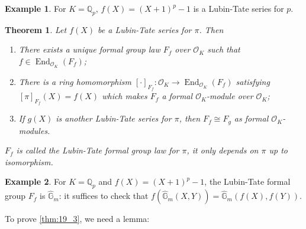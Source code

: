 \documentclass[11pt]{article}
\theoremstyle{definition}
\newtheorem*{example}{Example}
\theoremstyle{plain}
\newtheorem{theorem}[definition]{Theorem}
\theoremstyle{remark}
\DeclareMathOperator{\End}{End}
\newcommand{\QQ}{\mathbb{Q}}
\newcommand{\cO}{\mathcal{O}}
\newcommand{\Ghat}{\widehat{\mathbb{G}}}
\begin{document}
\begin{example}
    For $K = \QQ_p$, $f(X) = (X+1)^p-1$ is a Lubin-Tate series for $p$.
\end{example}

\begin{theorem}\label{thm:19_3}
    Let $f(X)$ be a Lubin-Tate series for $\pi$. Then
    \begin{enumerate}
        \item There exists a unique formal group law $F_f$ over $\cO_K$ such that $f \in \End_{\cO_K}(F_f)$;
        \item There is a ring homomorphism $[\cdot]_{F_f} : \cO_K \to \End_{\cO_K}(F_f)$ satisfying $[\pi]_{F_f}(X) = f(X)$ which makes $F_f$ a formal $\cO_K$-module over $\cO_K$;
        \item If $g(X)$ is another Lubin-Tate series for $\pi$, then $F_f \cong F_g$ as formal $\cO_K$-modules.
    \end{enumerate}
    $F_f$ is called the \emph{Lubin-Tate formal group law} for $\pi$, it only depends on $\pi$ up to isomorphism.
\end{theorem}

\begin{example}
    For $K = \QQ_p$ and $f(X) = (X+1)^p - 1$, the Lubin-Tate formal group $F_f$ is $\Ghat_m$: it suffices to check that $f(\Ghat_m(X, Y)) = \Ghat_m(f(X), f(Y))$.
\end{example}

\noindent To prove \autoref{thm:19_3}, we need a lemma:
\end{document}
